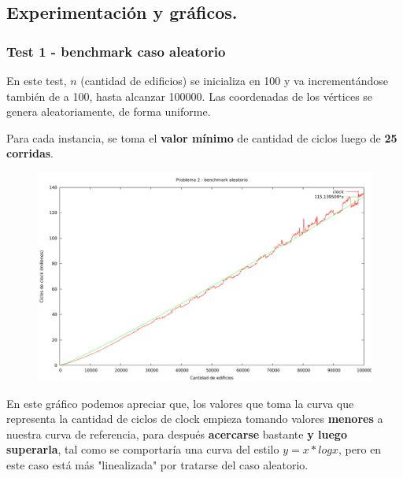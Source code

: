 \newpage


\subsection{Experimentación y gráficos.}

\vspace*{0.3cm}

\subsubsection{Test 1 - benchmark caso aleatorio}

En este test, $n$ (cantidad de edificios) se inicializa en 100 y va incrementándose también de a 100, 
hasta alcanzar 100000. Las coordenadas de los vértices se genera aleatoriamente, de forma uniforme.
 
Para cada instancia, se toma el \textbf{valor mínimo} de cantidad de ciclos luego de \textbf{25 corridas}. 

\vspace*{0.5cm}

\begin{figure}[h]
  \begin{center}
    \includegraphics[scale=0.35]{imagenes/grafico-2.png}
  \end{center}
\end{figure}

\vspace*{0.5cm}

En este gráfico podemos apreciar que, los valores que toma la curva que representa la cantidad de ciclos 
de clock empieza tomando valores \textbf{menores} a nuestra curva de referencia, para después \textbf{acercarse} bastante \textbf{y 
luego superarla}, tal como se comportaría una curva del estilo $y = x*log x$, pero en este caso está más 
"linealizada" por tratarse del caso aleatorio.

